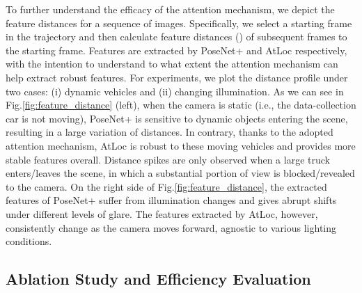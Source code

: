 \documentclass[letterpaper]{article}
\begin{document}
To further understand the efficacy of the attention mechanism, we depict the feature distances for a sequence of images. Specifically, we select a starting frame in the trajectory and then calculate feature distances () of subsequent frames to the starting frame. Features are extracted by PoseNet+ and AtLoc respectively, with the intention to understand to what extent the attention mechanism can help extract robust features. For experiments, we plot the distance profile under two cases: (i) dynamic vehicles and (ii) changing illumination. As we can see in Fig.\ref{fig:feature_distance} (left), when the camera is static (i.e., the data-collection car is not moving), PoseNet+ is sensitive to dynamic objects entering the scene, resulting in a large variation of distances. In contrary, thanks to the adopted attention mechanism, AtLoc is robust to these moving vehicles and provides more stable features overall. Distance spikes are only observed when a large truck enters/leaves the scene, in which a substantial portion of view is blocked/revealed to the camera.
On the right side of Fig.\ref{fig:feature_distance}, the extracted features of PoseNet+ suffer from illumination changes and gives abrupt shifts under different levels of glare. The features extracted by AtLoc, however, consistently change as the camera moves forward, agnostic to various lighting conditions.  



\subsection{Ablation Study and Efficiency Evaluation}
\end{document}
